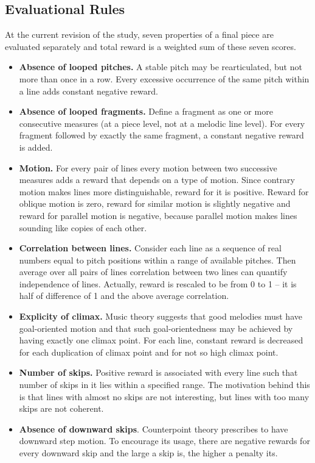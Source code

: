 \documentclass{article}
\begin{document}
\subsection{Evaluational Rules}
\label{subsec:setup}

At the current revision of the study, seven properties of a final piece are evaluated separately and total reward is a weighted sum of these seven scores.

\begin{itemize}
	\item \textbf{Absence of looped pitches.} A stable pitch may be rearticulated, but not more than once in a row. Every excessive occurrence of the same pitch within a line adds constant negative reward.
    \item \textbf{Absence of looped fragments.} Define a fragment as one or more consecutive measures (at a piece level, not at a melodic line level). For every fragment followed by exactly the same fragment, a constant negative reward is added.
	\item \textbf{Motion.} For every pair of lines every motion between two successive measures adds a reward that depends on a type of motion. Since contrary motion makes lines more distinguishable, reward for it is positive. Reward for oblique motion is zero, reward for similar motion is slightly negative and reward for parallel motion is negative, because parallel motion makes lines sounding like copies of each other.
	\item \textbf{Correlation between lines.} Consider each line as a sequence of real numbers equal to pitch positions within a range of available pitches. Then average over all pairs of lines correlation between two lines can quantify independence of lines. Actually, reward is rescaled to be from 0 to 1 -- it is half of difference of 1 and the above average correlation.
    \item \textbf{Explicity of climax.} Music theory suggests that good melodies must have goal-oriented motion and that such goal-orientedness may be achieved by having exactly one climax point. For each line, constant reward is decreased for each duplication of climax point and for not so high climax point.
    \item \textbf{Number of skips.} Positive reward is associated with every line such that number of skips in it lies within a specified range. The motivation behind this is that lines with almost no skips are not interesting, but lines with too many skips are not coherent.
    \item \textbf{Absence of downward skips}. Counterpoint theory prescribes to have downward step motion. To encourage its usage, there are negative rewards for every downward skip and the large a skip is, the higher a penalty its.
\end{itemize}
\end{document}
